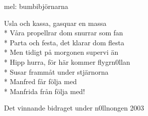 \begin{SongText}
    \begin{SongInfo}
        mel: bumbibjörnarna
    \end{SongInfo}
    \begin{SongVerse}
        Usla och kassa, gasquar en massa\\*%
        Våra propellrar dom snurrar som fan\\*%
        Parta och festa, det klarar dom flesta\\*%
        Men tidigt på morgonen supervi än\\*%
        Hipp hurra, för här kommer flygrn0llan\\*%
        Susar frammåt under stjärnorna\\*%
        Manfred får följa med\\*%
        Manfrida från följa med!
    \end{SongVerse}
    \begin{SongInfo}
        Det vinnande bidraget under n0llnongen 2003
    \end{SongInfo}
\end{SongText}
